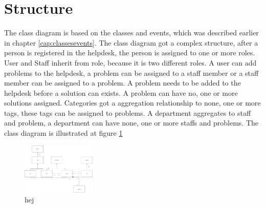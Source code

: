 \section{Structure}

The class diagram is based on the classes and events, which was described earlier in chapter \ref{cap:classesevents}. The class diagram got a complex structure, after a person is registered in the helpdesk, the person is assigned to one or more roles. User and Staff inherit from role, because it is two different roles. A user can add problems to the helpdesk, a problem can be assigned to a staff member or a staff member can be assigned to a problem. A problem needs to be added to the helpdesk before a solution can exists. A problem can have no, one or more solutions assigned. Categories got a aggregation relationship to none, one or more tags, these tags can be assigned to problems. A department aggregates to staff and problem, a department can have none, one or more staffs and problems.  The class diagram is illustrated at figure \ref{fig:pdaclassdiagram}

\begin{figure}
\includegraphics[width=100pt]{input/problem_domain_analysis/Klasse_diagram.jpg}
\caption{hej}
\label{fig:pdaclassdiagram}
\end{figure}